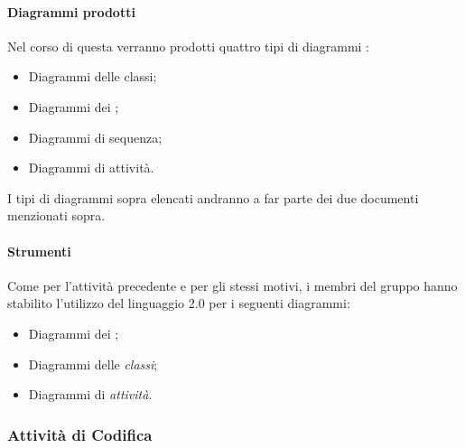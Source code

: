                         \paragraph*{Diagrammi prodotti}
                        Nel corso di questa  verranno prodotti quattro tipi di diagrammi :
                        \begin{itemize}
                        \item Diagrammi delle classi;
                        \item Diagrammi dei ;
                        \item Diagrammi di sequenza;
                        \item Diagrammi di attivit\`a.
                        \end{itemize}
                        I tipi di diagrammi sopra elencati andranno a far parte dei due documenti menzionati sopra.
		
		 
		        \paragraph*{Strumenti}
		        Come per l'attivit\`a precedente e per gli stessi motivi, i membri del gruppo hanno stabilito l'utilizzo del linguaggio  2.0 per i seguenti
		        diagrammi:
		        \begin{itemize}
			\item Diagrammi dei ; 
			\item Diagrammi delle \textit{classi};	
			\item Diagrammi di \textit{attivit\`a}.
		        \end{itemize}
			 
		
		\subsubsection{Attività di Codifica}
